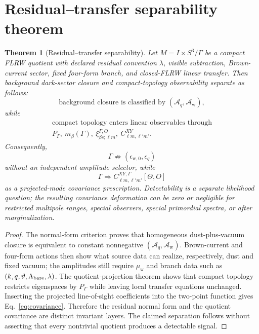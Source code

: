 \documentclass[
  aps,
  prd,
  reprint,
  superscriptaddress,
  floatfix,
  nofootinbib,
  longbibliography
]{revtex4-2}
\theoremstyle{plain}
\newtheorem{theorem}{Theorem}
\theoremstyle{definition}
\theoremstyle{remark}
\newcommand{\wind}{\mathrm w}
\newcommand{\Aq}{\mathcal A_q}
\newcommand{\Aw}{\mathcal A_{\mathrm w}}
\newcommand{\PG}{P_{\Gamma}}
\begin{document}
\section{Residual--transfer separability theorem}

\begin{theorem}[Residual--transfer separability]
Let \(M=I\times S^3/\Gamma\) be a compact FLRW quotient with declared residual convention \(\lambda\), visible subtraction, Brown-current sector, fixed four-form branch, and closed-FLRW linear transfer.  Then background dark-sector closure and compact-topology observability separate as follows:
\begin{equation}
\boxed{
\text{background closure is classified by }(\Aq,\Aw),
}
\end{equation}
while
\begin{equation}
\boxed{\begin{gathered}
\text{compact topology enters linear observables through}\\
\PG,\ m_\beta(\Gamma),\ 
\xi_{\beta s;\ell m}^{\Gamma,O},\ C_{\ell m,\ell'm'}^{XY}.
\end{gathered}}
\end{equation}
Consequently,
\begin{equation}
\boxed{
\Gamma\not\Rightarrow (\epsilon_{\wind,0},\epsilon_q)
}
\end{equation}
without an independent amplitude selector, while
\begin{equation}
\boxed{
\Gamma\Rightarrow C^{XY,\Gamma}_{\ell m,\ell'm'}[\Theta,O]
}
\end{equation}
as a projected-mode covariance prescription.  Detectability is a separate likelihood question; the resulting covariance deformation can be zero or negligible for restricted multipole ranges, special observers, special primordial spectra, or after marginalization.
\end{theorem}

\begin{proof}
The normal-form criterion proves that homogeneous dust-plus-vacuum closure is equivalent to constant nonnegative \((\Aq,\Aw)\).  Brown-current and four-form actions then show what source data can realize, respectively, dust and fixed vacuum; the amplitudes still require \(\mu_{\wind}\) and branch data such as \((k,q,\vartheta,\Lambda_{\rm bare},\lambda)\).  The quotient-projection theorem shows that compact topology restricts eigenspaces by \(\PG\) while leaving local transfer equations unchanged.  Inserting the projected line-of-sight coefficients into the two-point function gives Eq.~\eqref{eq:covariance}.  Therefore the residual normal form and the quotient covariance are distinct invariant layers.  The claimed separation follows without asserting that every nontrivial quotient produces a detectable signal.
\end{proof}
\end{document}
